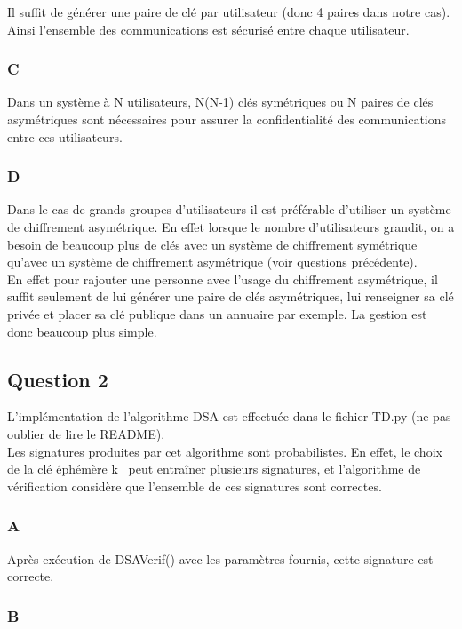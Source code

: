 \documentclass[a4paper, 11pt, oneside]{article}
\begin{document}
Il suffit de générer une paire de clé par utilisateur (donc 4 paires dans notre cas). Ainsi l'ensemble des communications est sécurisé entre chaque utilisateur.

\subsubsection{C}

Dans un système à N utilisateurs, N(N-1) clés symétriques ou N paires de clés asymétriques sont nécessaires pour assurer la confidentialité des communications entre ces utilisateurs.

\subsubsection{D}

Dans le cas de grands groupes d'utilisateurs il est préférable d'utiliser un système de chiffrement asymétrique. En effet lorsque le nombre d'utilisateurs grandit, on a besoin de beaucoup plus de clés avec un système de chiffrement symétrique qu'avec un système de chiffrement asymétrique (voir questions précédente).\\
En effet pour rajouter une personne avec l'usage du chiffrement asymétrique,  il suffit seulement de lui générer une paire de clés asymétriques, lui renseigner sa clé privée et placer sa clé publique dans un annuaire par exemple. La gestion est donc beaucoup plus simple.

\subsection{Question 2}

L'implémentation de l'algorithme DSA est effectuée dans le fichier TD.py (ne pas oublier de lire le README).\\
Les signatures produites par cet algorithme sont probabilistes. En effet, le choix de la clé éphémère \og k \fg \ peut entraîner plusieurs signatures, et l'algorithme de vérification considère que l'ensemble de ces signatures sont correctes.

\subsubsection{A}

Après exécution de DSAVerif() avec les paramètres fournis, cette signature est correcte.

\subsubsection{B}
\end{document}
